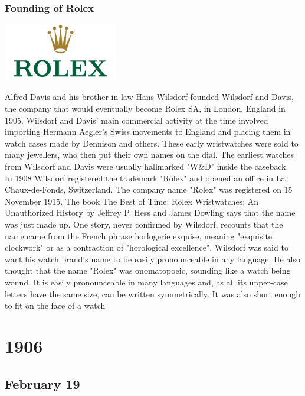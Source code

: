 \documentclass[11pt]{report}
\begin{document}
\subsection{Founding of Rolex}
\vspace{2mm}\begin{center}\includegraphics[width=5cm]{./img/rolexLogo.jpg}\end{center}
Alfred Davis and his brother-in-law Hans Wilsdorf founded Wilsdorf and Davis, the company that would eventually become Rolex SA, in London, England in 1905. Wilsdorf and Davis' main commercial activity at the time involved importing Hermann Aegler's Swiss movements to England and placing them in watch cases made by Dennison and others. These early wristwatches were sold to many jewellers, who then put their own names on the dial. The earliest watches from Wilsdorf and Davis were usually hallmarked "W\&D" inside the caseback.\\
\indent In 1908 Wilsdorf registered the trademark "Rolex" and opened an office in La Chaux-de-Fonds, Switzerland. The company name "Rolex" was registered on 15 November 1915. The book The Best of Time: Rolex Wristwatches: An Unauthorized History by Jeffrey P. Hess and James Dowling says that the name was just made up. One story, never confirmed by Wilsdorf, recounts that the name came from the French phrase horlogerie exquise, meaning "exquisite clockwork" or as a contraction of "horological excellence". Wilsdorf was said to want his watch brand's name to be easily pronounceable in any language. He also thought that the name "Rolex" was onomatopoeic, sounding like a watch being wound. It is easily pronounceable in many languages and, as all its upper-case letters have the same size, can be written symmetrically. It was also short enough to fit on the face of a watch

\chapter{1906}
\section{February 19}
\end{document}
